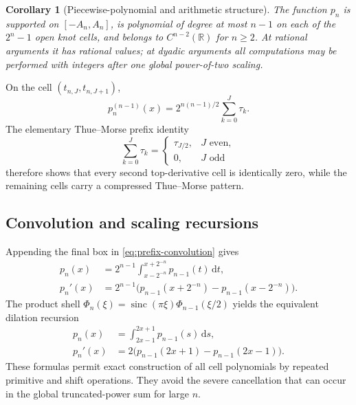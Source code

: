 \documentclass[11pt]{article}
\newtheorem{corollary}[theorem]{Corollary}
\theoremstyle{definition}
\theoremstyle{remark}
\newcommand{\R}{\mathbb R}
\newcommand{\sinc}{\operatorname{sinc}}
\newcommand{\dd}{\,\mathrm d}
\begin{document}
\begin{corollary}[Piecewise-polynomial and arithmetic structure]
\label{cor:piecewise-arithmetic}
The function $p_n$ is supported on $[-A_n,A_n]$, is polynomial of degree at most
$n-1$ on each of the $2^n-1$ open knot cells, and belongs to $C^{n-2}(\R)$ for
$n\ge2$.  At rational arguments it has rational values; at dyadic arguments all
computations may be performed with integers after one global power-of-two scaling.
\end{corollary}

On the cell $(t_{n,J},t_{n,J+1})$,
\begin{equation}
 p_n^{(n-1)}(x)=2^{n(n-1)/2}\sum_{k=0}^{J}\tau_k.
 \label{eq:top-cell-value}
\end{equation}
The elementary Thue--Morse prefix identity
\begin{equation}
 \sum_{k=0}^{J}\tau_k=
 \begin{cases}
   \tau_{J/2},&J\text{ even},\\
   0,&J\text{ odd}
 \end{cases}
 \label{eq:tm-prefix}
\end{equation}
therefore shows that every second top-derivative cell is identically zero, while the
remaining cells carry a compressed Thue--Morse pattern.

\subsection{Convolution and scaling recursions}

Appending the final box in \cref{eq:prefix-convolution} gives
\begin{align}
 p_n(x)
 &=2^{n-1}\int_{x-2^{-n}}^{x+2^{-n}}p_{n-1}(t)\dd t,
 \label{eq:last-box-recursion}\\
 p_n'(x)
 &=2^{n-1}\bigl(p_{n-1}(x+2^{-n})-p_{n-1}(x-2^{-n})\bigr).
 \label{eq:last-box-derivative}
\end{align}
The product shell
$\Phi_n(\xi)=\sinc(\pi\xi)\Phi_{n-1}(\xi/2)$ yields the equivalent dilation recursion
\begin{align}
 p_n(x)&=\int_{2x-1}^{2x+1}p_{n-1}(s)\dd s,
 \label{eq:scale-recursion}\\
 p_n'(x)&=2\bigl(p_{n-1}(2x+1)-p_{n-1}(2x-1)\bigr).
 \label{eq:scale-derivative}
\end{align}
These formulas permit exact construction of all cell polynomials by repeated primitive
and shift operations.  They avoid the severe cancellation that can occur in the global
truncated-power sum for large $n$.
\end{document}
